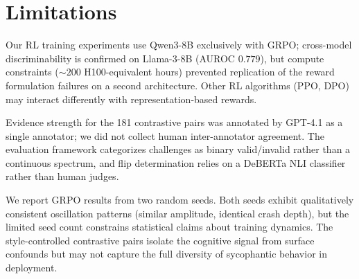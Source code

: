 \section{Limitations}\label{sec:limitations}

Our RL training experiments use Qwen3-8B exclusively with GRPO; cross-model discriminability is confirmed on Llama-3-8B (AUROC $0.779$), but compute constraints (${\sim}200$ H100-equivalent hours) prevented replication of the reward formulation failures on a second architecture. Other RL algorithms (PPO, DPO) may interact differently with representation-based rewards.

Evidence strength for the 181 contrastive pairs was annotated by GPT-4.1 as a single annotator; we did not collect human inter-annotator agreement. The evaluation framework categorizes challenges as binary valid/invalid rather than a continuous spectrum, and flip determination relies on a DeBERTa NLI classifier rather than human judges.

We report GRPO results from two random seeds. Both seeds exhibit qualitatively consistent oscillation patterns (similar amplitude, identical crash depth), but the limited seed count constrains statistical claims about training dynamics. The style-controlled contrastive pairs isolate the cognitive signal from surface confounds but may not capture the full diversity of sycophantic behavior in deployment.
